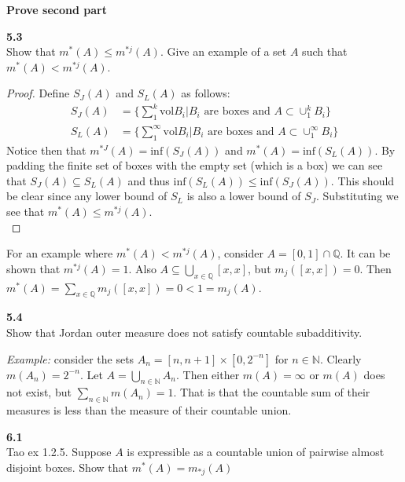 \documentclass[12pt]{article}
\newcommand{\problem}[1]{\hspace{-4 ex} \large \textbf{#1}\\}
\begin{document}
	\textbf{Prove second part}



\problem{5.3} Show that $m^*(A)\leq m^{*j}(A)$. Give an example of a set $A$ such that $m^*(A)<m^{*j}(A)$.
	
	\begin{proof}
		Define $S_J(A)$ and $S_L(A)$ as follows:
		\begin{align*}
			S_J(A) & = \Bigg\{\sum_1^k\text{vol}B_i \Bigg \vert B_i \text{ are boxes and } A \subset \cup_1^k B_i \Bigg\} \\
			S_L(A) & = \Bigg\{\sum_1^\infty\text{vol}B_i \Bigg \vert B_i \text{ are boxes and } A \subset \cup_1^\infty B_i \Bigg\}
		\end{align*}
	Notice then that $m^{*J}(A) = \text{inf}(S_J(A))$ and $m^{*}(A) = \text{inf}(S_L(A))$. By padding the finite set of boxes with the empty set (which is a box) we can see that $S_J(A) \subseteq S_L(A)$ and thus $\text{inf}(S_L(A)) \leq \text{inf}(S_J(A))$. This should be clear since any lower bound of $S_L$ is also a lower bound of $S_J$. Substituting we see that $m^*(A)\leq m^{*j}(A)$. \\
	\end{proof}
	
	For an example where $m^*(A)<m^{*j}(A)$, consider $A = [0,1] \cap \mathbb{Q}$. It can be shown that $m^{*j}(A)=1$. Also $A \subseteq \bigcup\limits_{x \in \mathbb{Q}}[x,x]$, but $m_j([x,x])=0$. Then $m^*(A) = \sum\limits_{x \in \mathbb{Q}}m_j([x,x]) = 0 < 1 = m_j(A)$. 
	


\problem{5.4} Show that Jordan outer measure does not satisfy countable subadditivity.

	\textit{Example:} consider the sets $A_n = [n,n+1] \times [0, 2^{-n}]$ for $n \in \mathbb{N}$. Clearly $m(A_n) = 2^{-n}$. Let $A = \bigcup\limits_{n \in \mathbb{N}}A_n$. Then either $m(A) = \infty$ or $m(A)$ does not exist, but $\sum\limits_{n \in \mathbb{N}}m(A_n) = 1$. That is that the countable sum of their measures is less than the measure of their countable union.



\problem{6.1}Tao ex 1.2.5. Suppose $A$ is expressible as a countable union of pairwise almost disjoint boxes. Show that $m^*(A)=m_{*j}(A)$
\end{document}
